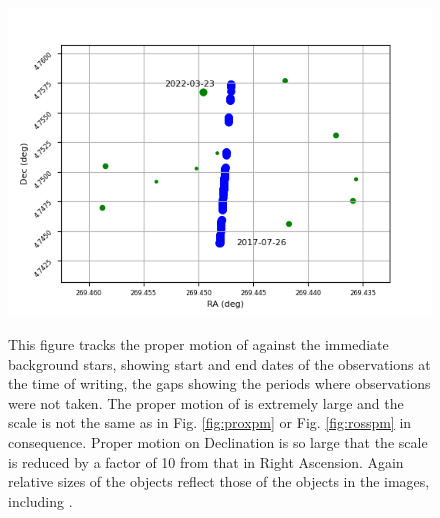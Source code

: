 \begin{figure}[!htbp]
\begin{center}
\includegraphics[scale=.8]{images/pmbstar.png} \\
\end{center}
\caption{This figure tracks the proper motion of {\bstar} against the immediate
background stars, showing start and end dates of the observations at the time
of writing, the gaps showing the periods where observations were not taken. The proper motion of {\bstar} is
extremely large and the scale is not the same as in Fig. \ref{fig:proxpm} or
Fig.  \ref{fig:rosspm} in consequence. Proper motion on Declination is so large
that the scale is reduced by a factor of 10 from that in Right Ascension.
Again relative sizes of the objects reflect those of the objects in the images,
including \bstar.} \protect\label{fig:bspm}
\end{figure}

